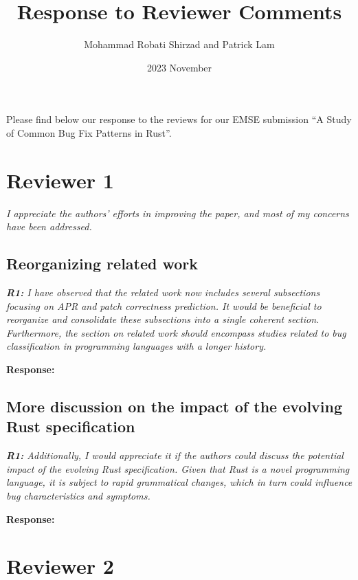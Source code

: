 \documentclass{article}
\title{Response to Reviewer Comments}
\date{2023 November}
\author{Mohammad Robati Shirzad and Patrick Lam}
\begin{document}
\maketitle

Please find below our response to the reviews for our EMSE submission ``A Study of Common Bug Fix Patterns in Rust''.

\section{Reviewer 1}

\textit{I appreciate the authors' efforts in improving the paper, and most of my concerns have been addressed.}

\subsection{Reorganizing related work}

\textit{\textbf{R1:} I have observed that the related work now includes several subsections focusing on APR and patch correctness prediction. It would be beneficial to reorganize and consolidate these subsections into a single coherent section. Furthermore, the section on related work should encompass studies related to bug classification in programming languages with a longer history.}

\vspace*{1em} \noindent \textbf{Response:} 

\subsection{More discussion on the impact of the evolving Rust specification}

\textit{\textbf{R1:} Additionally, I would appreciate it if the authors could discuss the potential impact of the evolving Rust specification. Given that Rust is a novel programming language, it is subject to rapid grammatical changes, which in turn could influence bug characteristics and symptoms.}

\vspace*{1em} \noindent \textbf{Response:} 

\section{Reviewer 2}
\end{document}
